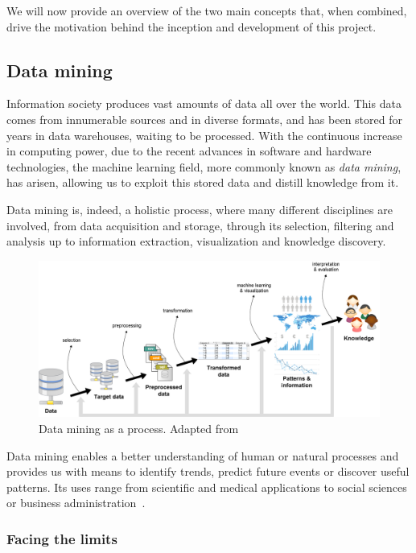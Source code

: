 We will now provide an overview of the two main concepts that, when combined,
drive the motivation behind the inception and development of this project.

\subsection{Data mining}

Information society produces vast amounts of data all over the world.
This data comes from innumerable sources and in diverse formats, and has been stored 
for years in data warehouses, waiting to be processed. With the continuous increase 
in computing power, due to the recent advances in software and hardware technologies, 
the machine learning field, more commonly known as \textit{data mining}, has arisen, 
allowing us to exploit this stored data and distill knowledge from it.

Data mining is, indeed, a holistic process, where many different disciplines are 
involved, from data acquisition and storage, through its selection, filtering and 
analysis up to information extraction, visualization and knowledge discovery.

\begin{figure}[h]
	\centering
	\includegraphics[width=0.9\linewidth]{Figures/data-mining-process.png}
	\caption{Data mining as a process. Adapted from~\citet{Fayyad:FromDataMining}}
	\label{fig:data-mining}
\end{figure}

Data mining enables a better understanding of human or natural processes and provides 
us with means to identify trends, predict future events or discover useful patterns. 
Its uses range from scientific and medical applications to social sciences or business
administration~\citep{Fayyad:FromDataMining}.

\subsubsection{Facing the limits}

